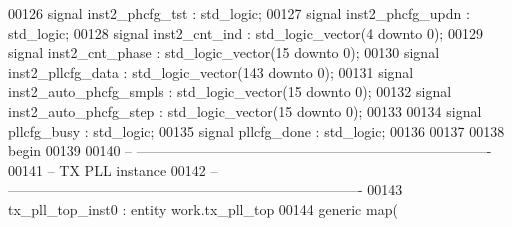 \begin{DoxyCode}
00126 \textcolor{keywordflow}{signal} \textcolor{vhdlchar}{inst2_phcfg_tst}        \textcolor{vhdlchar}{:} \textcolor{comment}{std\_logic};
00127 \textcolor{keywordflow}{signal} \textcolor{vhdlchar}{inst2_phcfg_updn}       \textcolor{vhdlchar}{:} \textcolor{comment}{std\_logic};
00128 \textcolor{keywordflow}{signal} \textcolor{vhdlchar}{inst2_cnt_ind}          \textcolor{vhdlchar}{:} \textcolor{comment}{std\_logic\_vector}\textcolor{vhdlchar}{(}\textcolor{vhdllogic}{}\textcolor{vhdllogic}{4} \textcolor{keywordflow}{downto} \textcolor{vhdllogic}{}\textcolor{vhdllogic}{0}\textcolor{vhdlchar}{)};
00129 \textcolor{keywordflow}{signal} \textcolor{vhdlchar}{inst2_cnt_phase}        \textcolor{vhdlchar}{:} \textcolor{comment}{std\_logic\_vector}\textcolor{vhdlchar}{(}\textcolor{vhdllogic}{}\textcolor{vhdllogic}{15} \textcolor{keywordflow}{downto} \textcolor{vhdllogic}{}\textcolor{vhdllogic}{0}\textcolor{vhdlchar}{)};
00130 \textcolor{keywordflow}{signal} \textcolor{vhdlchar}{inst2_pllcfg_data}      \textcolor{vhdlchar}{:} \textcolor{comment}{std\_logic\_vector}\textcolor{vhdlchar}{(}\textcolor{vhdllogic}{}\textcolor{vhdllogic}{143} \textcolor{keywordflow}{downto} \textcolor{vhdllogic}{}\textcolor{vhdllogic}{0}\textcolor{vhdlchar}{)};
00131 \textcolor{keywordflow}{signal} \textcolor{vhdlchar}{inst2_auto_phcfg_smpls} \textcolor{vhdlchar}{:} \textcolor{comment}{std\_logic\_vector}\textcolor{vhdlchar}{(}\textcolor{vhdllogic}{}\textcolor{vhdllogic}{15} \textcolor{keywordflow}{downto} \textcolor{vhdllogic}{}\textcolor{vhdllogic}{0}\textcolor{vhdlchar}{)};
00132 \textcolor{keywordflow}{signal} \textcolor{vhdlchar}{inst2_auto_phcfg_step}  \textcolor{vhdlchar}{:} \textcolor{comment}{std\_logic\_vector}\textcolor{vhdlchar}{(}\textcolor{vhdllogic}{}\textcolor{vhdllogic}{15} \textcolor{keywordflow}{downto} \textcolor{vhdllogic}{}\textcolor{vhdllogic}{0}\textcolor{vhdlchar}{)};
00133 
00134 \textcolor{keywordflow}{signal} \textcolor{vhdlchar}{pllcfg_busy}            \textcolor{vhdlchar}{:} \textcolor{comment}{std\_logic};
00135 \textcolor{keywordflow}{signal} \textcolor{vhdlchar}{pllcfg_done}            \textcolor{vhdlchar}{:} \textcolor{comment}{std\_logic};
00136 
00137   
00138 \textcolor{vhdlkeyword}{begin}
00139 
00140 \textcolor{keyword}{-- ----------------------------------------------------------------------------}
00141 \textcolor{keyword}{-- TX PLL instance}
00142 \textcolor{keyword}{-- ----------------------------------------------------------------------------}
00143 tx\_pll\_top\_inst0 : \textcolor{keywordflow}{entity} work.tx_pll_top
00144    \textcolor{keywordflow}{generic} \textcolor{keywordflow}{map}(

\end{DoxyCode}
